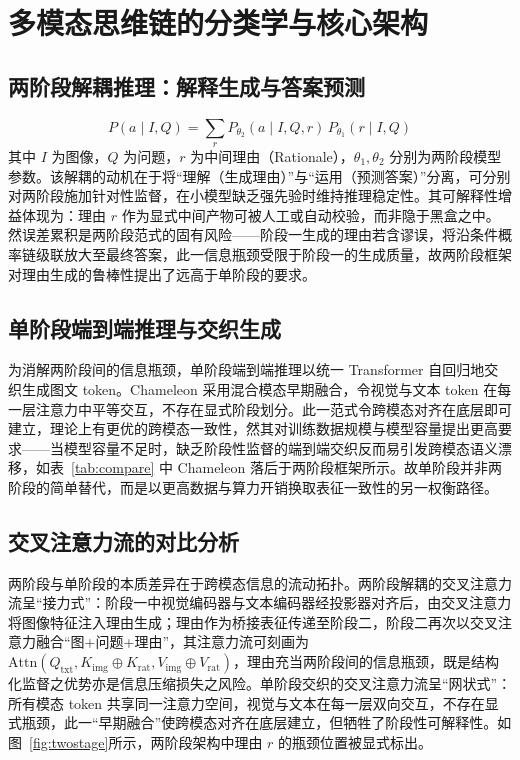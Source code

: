 \documentclass[twocolumn]{ctexart}
\begin{document}
\section{多模态思维链的分类学与核心架构}\label{sec:taxonomy}
\subsection{两阶段解耦推理：解释生成与答案预测}\label{sec:tax:twostage}
\begin{equation}\label{eq:twostage}
P(a\mid I,Q)=\sum_{r}P_{\theta_{2}}(a\mid I,Q,r)\,P_{\theta_{1}}(r\mid I,Q)
\end{equation}
其中 $I$ 为图像，$Q$ 为问题，$r$ 为中间理由（Rationale），$\theta_{1},\theta_{2}$ 分别为两阶段模型参数。该解耦的动机在于将“理解（生成理由）”与“运用（预测答案）”分离，可分别对两阶段施加针对性监督，在小模型缺乏强先验时维持推理稳定性。其可解释性增益体现为：理由 $r$ 作为显式中间产物可被人工或自动校验，而非隐于黑盒之中。然误差累积是两阶段范式的固有风险——阶段一生成的理由若含谬误，将沿条件概率链级联放大至最终答案，此一信息瓶颈受限于阶段一的生成质量，故两阶段框架对理由生成的鲁棒性提出了远高于单阶段的要求。

\subsection{单阶段端到端推理与交织生成}\label{sec:tax:onstage}
为消解两阶段间的信息瓶颈，单阶段端到端推理以统一 Transformer 自回归地交织生成图文 token。Chameleon\cite{team2024chameleon} 采用混合模态早期融合，令视觉与文本 token 在每一层注意力中平等交互，不存在显式阶段划分。此一范式令跨模态对齐在底层即可建立，理论上有更优的跨模态一致性，然其对训练数据规模与模型容量提出更高要求——当模型容量不足时，缺乏阶段性监督的端到端交织反而易引发跨模态语义漂移，如表~\ref{tab:compare} 中 Chameleon 落后于两阶段框架所示。故单阶段并非两阶段的简单替代，而是以更高数据与算力开销换取表征一致性的另一权衡路径。

\subsection{交叉注意力流的对比分析}\label{sec:tax:crossattn}
两阶段与单阶段的本质差异在于跨模态信息的流动拓扑。两阶段解耦的交叉注意力流呈“接力式”：阶段一中视觉编码器与文本编码器经投影器对齐后，由交叉注意力将图像特征注入理由生成；理由作为桥接表征传递至阶段二，阶段二再次以交叉注意力融合“图+问题+理由”，其注意力流可刻画为 $\text{Attn}(Q_{\text{txt}},K_{\text{img}}\oplus K_{\text{rat}},V_{\text{img}}\oplus V_{\text{rat}})$，理由充当两阶段间的信息瓶颈，既是结构化监督之优势亦是信息压缩损失之风险。单阶段交织的交叉注意力流呈“网状式”：所有模态 token 共享同一注意力空间，视觉与文本在每一层双向交互，不存在显式瓶颈，此一“早期融合”使跨模态对齐在底层建立，但牺牲了阶段性可解释性。如图~\ref{fig:twostage}所示，两阶段架构中理由 $r$ 的瓶颈位置被显式标出。
\end{document}
